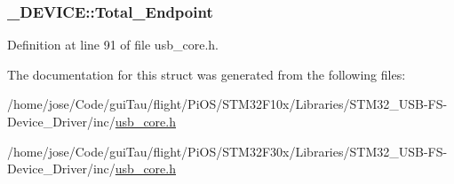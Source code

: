 \hypertarget{struct___d_e_v_i_c_e_a71a35c7d6066f9512effe87efab7e99a}{
\subsubsection[{Total\-\_\-\-Endpoint}]{ \-\_\-\-D\-E\-V\-I\-C\-E\-::\-Total\-\_\-\-Endpoint}}\label{struct___d_e_v_i_c_e_a71a35c7d6066f9512effe87efab7e99a}


Definition at line 91 of file usb\-\_\-core.\-h.



The documentation for this struct was generated from the following files\-:\begin{DoxyCompactItemize}
\item 
/home/jose/\-Code/gui\-Tau/flight/\-Pi\-O\-S/\-S\-T\-M32\-F10x/\-Libraries/\-S\-T\-M32\-\_\-\-U\-S\-B-\/\-F\-S-\/\-Device\-\_\-\-Driver/inc/\hyperlink{_s_t_m32_f10x_2_libraries_2_s_t_m32___u_s_b-_f_s-_device___driver_2inc_2usb__core_8h}{usb\-\_\-core.\-h}\item 
/home/jose/\-Code/gui\-Tau/flight/\-Pi\-O\-S/\-S\-T\-M32\-F30x/\-Libraries/\-S\-T\-M32\-\_\-\-U\-S\-B-\/\-F\-S-\/\-Device\-\_\-\-Driver/inc/\hyperlink{_s_t_m32_f30x_2_libraries_2_s_t_m32___u_s_b-_f_s-_device___driver_2inc_2usb__core_8h}{usb\-\_\-core.\-h}\end{DoxyCompactItemize}
